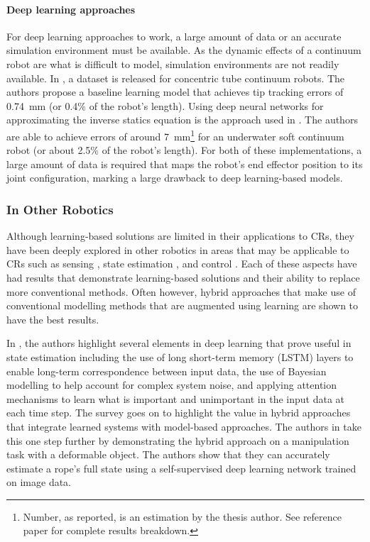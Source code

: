 \paragraph{Deep learning approaches}
For deep learning approaches to work, a large amount of data or an accurate simulation environment must be available. As the dynamic effects of a continuum robot are what is difficult to model, simulation environments are not readily available. In \cite{grassmann2022a}, a dataset is released for concentric tube continuum robots. The authors propose a baseline learning model that achieves tip tracking errors of \SI{0.74}{mm} (or 0.4\% of the robot's length).  Using deep neural networks for approximating the inverse statics equation is the approach used in \cite{7112506}. The authors are able to achieve errors of around \SI{7}{mm}\footnote{Number, as reported, is an estimation by the thesis author. See reference paper for complete results breakdown.} for an underwater soft continuum robot (or about 2.5\% of the robot's length). For both of these implementations, a large amount of data is required that maps the robot's end effector position to its joint configuration, marking a large drawback to deep learning-based models. 

\subsubsection{In Other Robotics}
Although learning-based solutions are limited in their applications to CRs, they have been deeply explored in other robotics in areas that may be applicable to CRs such as sensing \cite{8643440, 9001195}, state estimation \cite{s21062085, 8972568, 8643440}, and control \cite{doi:10.1146/annurev-control-090419-075625, TOQUICA2021106682}. Each of these aspects have had results that demonstrate learning-based solutions and their ability to replace more conventional methods. Often however, hybrid approaches that make use of conventional modelling methods that are augmented using learning are shown to have the best results. 

In \cite{s21062085}, the authors highlight several elements in deep learning that prove useful in state estimation including the use of long short-term memory (LSTM) layers to enable long-term correspondence between input data, the use of Bayesian modelling to help account for complex system noise, and applying attention mechanisms to learn what is important and unimportant in the input data at each time step. The survey goes on to highlight the value in hybrid approaches that integrate learned systems with model-based approaches. The authors in \cite{8972568} take this one step further by demonstrating the hybrid approach on a manipulation task with a deformable object. The authors show that they can accurately estimate a rope's full state using a self-supervised deep learning network trained on image data. 

